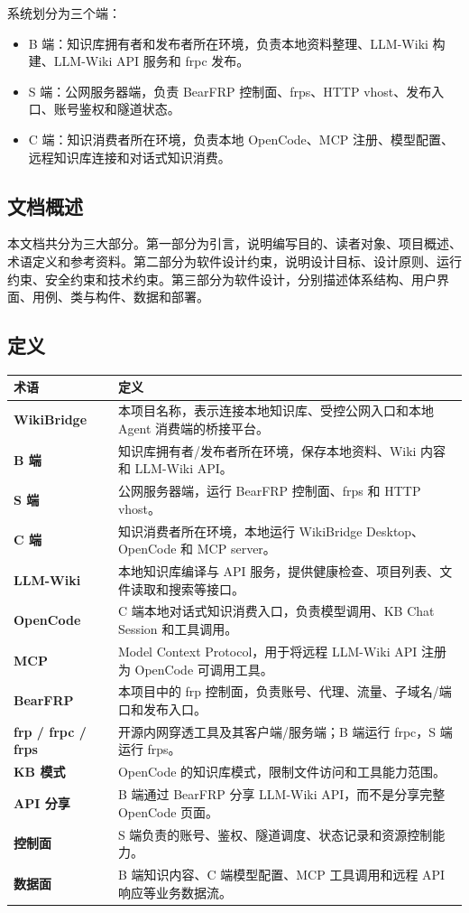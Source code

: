 \documentclass[UTF8,a4paper,12pt,fontset=fandol]{ctexart}
\begin{document}
系统划分为三个端：
\begin{itemize}
  \item B 端：知识库拥有者和发布者所在环境，负责本地资料整理、LLM-Wiki 构建、LLM-Wiki API 服务和 frpc 发布。
  \item S 端：公网服务器端，负责 BearFRP 控制面、frps、HTTP vhost、发布入口、账号鉴权和隧道状态。
  \item C 端：知识消费者所在环境，负责本地 OpenCode、MCP 注册、模型配置、远程知识库连接和对话式知识消费。
\end{itemize}

\subsection{文档概述}
本文档共分为三大部分。第一部分为引言，说明编写目的、读者对象、项目概述、术语定义和参考资料。第二部分为软件设计约束，说明设计目标、设计原则、运行约束、安全约束和技术约束。第三部分为软件设计，分别描述体系结构、用户界面、用例、类与构件、数据和部署。

\subsection{定义}
\begin{longtable}{>{\bfseries}p{3.2cm}p{11.0cm}}
\toprule
术语 & 定义 \\
\midrule
WikiBridge & 本项目名称，表示连接本地知识库、受控公网入口和本地 Agent 消费端的桥接平台。 \\
B 端 & 知识库拥有者/发布者所在环境，保存本地资料、Wiki 内容和 LLM-Wiki API。 \\
S 端 & 公网服务器端，运行 BearFRP 控制面、frps 和 HTTP vhost。 \\
C 端 & 知识消费者所在环境，本地运行 WikiBridge Desktop、OpenCode 和 MCP server。 \\
LLM-Wiki & 本地知识库编译与 API 服务，提供健康检查、项目列表、文件读取和搜索等接口。 \\
OpenCode & C 端本地对话式知识消费入口，负责模型调用、KB Chat Session 和工具调用。 \\
MCP & Model Context Protocol，用于将远程 LLM-Wiki API 注册为 OpenCode 可调用工具。 \\
BearFRP & 本项目中的 frp 控制面，负责账号、代理、流量、子域名/端口和发布入口。 \\
frp / frpc / frps & 开源内网穿透工具及其客户端/服务端；B 端运行 frpc，S 端运行 frps。 \\
KB 模式 & OpenCode 的知识库模式，限制文件访问和工具能力范围。 \\
API 分享 & B 端通过 BearFRP 分享 LLM-Wiki API，而不是分享完整 OpenCode 页面。 \\
控制面 & S 端负责的账号、鉴权、隧道调度、状态记录和资源控制能力。 \\
数据面 & B 端知识内容、C 端模型配置、MCP 工具调用和远程 API 响应等业务数据流。 \\
\bottomrule
\end{longtable}
\end{document}
